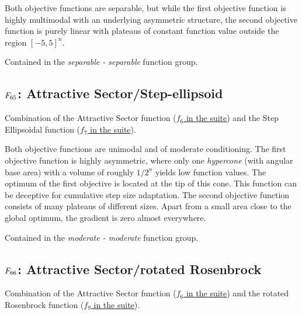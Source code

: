 Both objective functions are separable, but while the first objective function
is highly multimodal with an underlying asymmetric structure, the second objective
function is purely linear with plateaus of constant function value outside
the region \([-5,5]^n\).

Contained in the \emph{separable - separable} function group.



\subsection[\texorpdfstring{\protect\(F_{65}\protect\): Attractive Sector/Step-ellipsoid}{F65: Attractive Sector/Step-ellipsoid}]{\texorpdfstring{\protect\(F_{65}\protect\): Attractive Sector/Step-ellipsoid}{}}
\label{index:f65}\label{index:attractive-sector-step-ellipsoid}
Combination of the Attractive Sector function (\href{https://coco.gforge.inria.fr/downloads/download16.00/bbobdocfunctions.pdf\#page=30}{\(f_6\) in the \bbob suite}) and the
Step Ellipsoidal function (\href{https://coco.gforge.inria.fr/downloads/download16.00/bbobdocfunctions.pdf\#page=35}{\(f_7\) in the \bbob suite}).

Both objective functions are unimodal and of moderate conditioning.
The first objective function is highly asymmetric, where only one \emph{hypercone}
(with angular base area) with a volume of roughly \(1/2^n\) yields low function values.
The optimum of the first objective is located at the tip of this cone. This function can
be deceptive for cumulative step size adaptation. The second objective function consists
of many plateaus of different sizes. Apart from a small area close to the global optimum,
the gradient is zero almost everywhere.

Contained in the \emph{moderate - moderate} function group.



\subsection[\texorpdfstring{\protect\(F_{66}\protect\): Attractive Sector/rotated Rosenbrock}{F66: Attractive Sector/rotated Rosenbrock}]{\texorpdfstring{\protect\(F_{66}\protect\): Attractive Sector/rotated Rosenbrock}{}}
\label{index:f66}\label{index:attractive-sector-rotated-rosenbrock}
Combination of the Attractive Sector function (\href{https://coco.gforge.inria.fr/downloads/download16.00/bbobdocfunctions.pdf\#page=30}{\(f_6\) in the \bbob suite}) and the
rotated Rosenbrock function (\href{https://coco.gforge.inria.fr/downloads/download16.00/bbobdocfunctions.pdf\#page=45}{\(f_9\) in the \bbob suite}).

